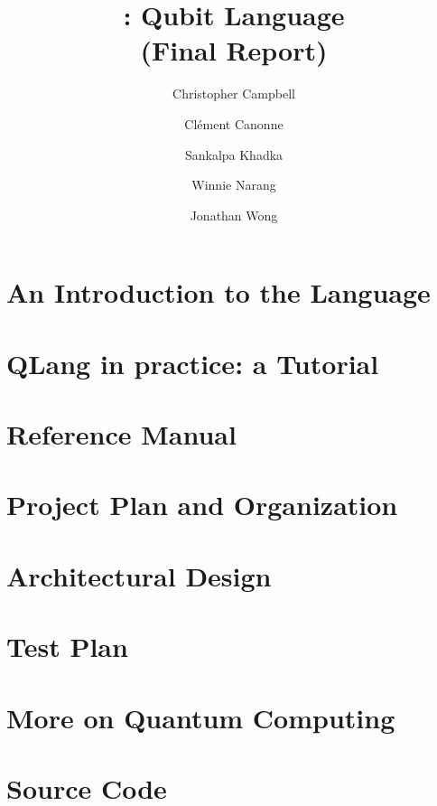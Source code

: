 \documentclass[11pt]{report}
\title{\QL: Qubit Language\\ \Large(Final Report)}
\author{
  Christopher Campbell
  \and Cl\'ement Canonne
  \and Sankalpa Khadka
  \and Winnie Narang
  \and Jonathan Wong
}
\newcommand{\QL}{\textsf{QLang}\xspace}
\begin{document}
\maketitle
\tableofcontents

\chapter{An Introduction to the Language}
  
\chapter{\QL in practice: a Tutorial}
  
\chapter{Reference Manual}\label{sec:reference}
  
\chapter{Project Plan and Organization}
\chapter{Architectural Design}
\chapter{Test Plan}
\appendix
\chapter{More on Quantum Computing}\label{app:quantum:more}
  
\chapter{Source Code}
\end{document}

